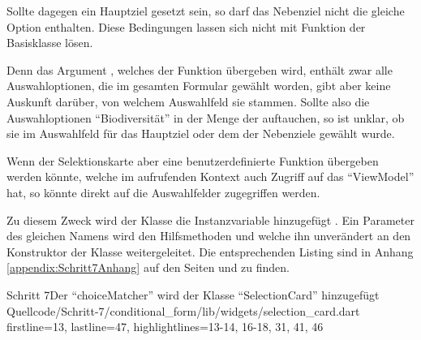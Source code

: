 Sollte dagegen ein Hauptziel gesetzt sein, so darf das Nebenziel nicht die gleiche Option enthalten.
Diese Bedingungen lassen sich nicht mit Funktion  der Basisklasse  lösen.

Denn das Argument ,
welches der Funktion  übergeben wird,
enthält zwar alle Auswahloptionen,
die im gesamten Formular gewählt worden,
gibt aber keine Auskunft darüber,
von welchem Auswahlfeld sie stammen. 
Sollte also die Auswahloptionen \enquote{Biodiversität} in der Menge der  auftauchen,
so ist unklar,
ob sie im Auswahlfeld für das Hauptziel oder dem der Nebenziele gewählt wurde.

Wenn der Selektionskarte aber eine benutzerdefinierte Funktion übergeben werden könnte,
welche im aufrufenden Kontext auch Zugriff auf das \enquote{ViewModel} hat,
so könnte direkt auf die Auswahlfelder zugegriffen werden.


Zu diesem Zweck wird der Klasse  die Instanzvariable  hinzugefügt .
Ein Parameter des gleichen Namens wird den Hilfsmethoden  und  welche ihn unverändert an den Konstruktor der Klasse  weitergeleitet.
Die entsprechenden Listing sind in Anhang \ref{appendix:Schritt7Anhang} auf den Seiten \pageref{lst:Schritt7AppendixbuildSelectionCard} und \pageref{lst:Schritt7buildMultiSelectionCard} zu finden. 






\begin{alexlisting}{Schritt 7}{Der \enquote{choiceMatcher} wird der Klasse \enquote{SelectionCard} hinzugefügt}
  {Quellcode/Schritt-7/conditional_form/lib/widgets/selection_card.dart}
  {firstline=13, lastline=47, highlightlines={13-14, 16-18, 31, 41, 46}}
  \label{lst:Schritt7SelectionCard}
\end{alexlisting}

